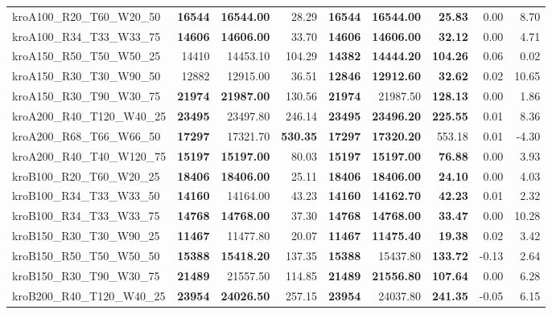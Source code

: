 \documentclass{singlecol-new}
\begin{document}
\begin{scriptsize}
\begin{longtable}{lrrrrrrrr}
		kroA100\_R20\_T60\_W20\_50 & \textbf{16544} & \textbf{16544.00} & 28.29 & \textbf{16544} & \textbf{16544.00} & \textbf{25.83} & 0.00 & 8.70 \\
		kroA100\_R34\_T33\_W33\_75 & \textbf{14606} & \textbf{14606.00} & 33.70 & \textbf{14606} & \textbf{14606.00} & \textbf{32.12} & 0.00 & 4.71 \\
		kroA150\_R50\_T50\_W50\_25 & 14410 & 14453.10 & 104.29 & \textbf{14382} & \textbf{14444.20} & \textbf{104.26} & 0.06 & 0.02 \\
		kroA150\_R30\_T30\_W90\_50 & 12882 & 12915.00 & 36.51 & \textbf{12846} & \textbf{12912.60} & \textbf{32.62} & 0.02 & 10.65 \\
		kroA150\_R30\_T90\_W30\_75 & \textbf{21974} & \textbf{21987.00} & 130.56 & \textbf{21974} & 21987.50 & \textbf{128.13} & 0.00 & 1.86 \\
		kroA200\_R40\_T120\_W40\_25 & \textbf{23495} & 23497.80 & 246.14 & \textbf{23495} & \textbf{23496.20} & \textbf{225.55} & 0.01 & 8.36 \\
		kroA200\_R68\_T66\_W66\_50 & \textbf{17297} & 17321.70 & \textbf{530.35} & \textbf{17297} & \textbf{17320.20} & 553.18 & 0.01 & -4.30 \\
		kroA200\_R40\_T40\_W120\_75 & \textbf{15197} & \textbf{15197.00} & 80.03 & \textbf{15197} & \textbf{15197.00} & \textbf{76.88} & 0.00 & 3.93 \\
		kroB100\_R20\_T60\_W20\_25 & \textbf{18406} & \textbf{18406.00} & 25.11 & \textbf{18406} & \textbf{18406.00} & \textbf{24.10} & 0.00 & 4.03 \\
		kroB100\_R34\_T33\_W33\_50 & \textbf{14160} & 14164.00 & 43.23 & \textbf{14160} & \textbf{14162.70} & \textbf{42.23} & 0.01 & 2.32 \\
		kroB100\_R34\_T33\_W33\_75 & \textbf{14768} & \textbf{14768.00} & 37.30 & \textbf{14768} & \textbf{14768.00} & \textbf{33.47} & 0.00 & 10.28 \\
		kroB150\_R30\_T30\_W90\_25 & \textbf{11467} & 11477.80 & 20.07 & \textbf{11467} & \textbf{11475.40} & \textbf{19.38} & 0.02 & 3.42 \\
		kroB150\_R50\_T50\_W50\_50 & \textbf{15388} & \textbf{15418.20} & 137.35 & \textbf{15388} & 15437.80 & \textbf{133.72} & -0.13 & 2.64 \\
		kroB150\_R30\_T90\_W30\_75 & \textbf{21489} & 21557.50 & 114.85 & \textbf{21489} & \textbf{21556.80} & \textbf{107.64} & 0.00 & 6.28 \\
		kroB200\_R40\_T120\_W40\_25 & \textbf{23954} & \textbf{24026.50} & 257.15 & \textbf{23954} & 24037.80 & \textbf{241.35} & -0.05 & 6.15 \\

\end{longtable}
\end{scriptsize}
\end{document}
